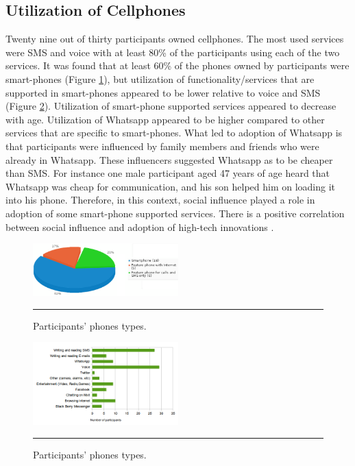 \subsection{Utilization of Cellphones}
Twenty nine out of thirty participants owned cellphones. The most used services were SMS and voice with at least 80\% of the participants using each of the two services. It was found that at least 60\% of the phones owned by participants were smart-phones (Figure \ref{figure:cell_ownership}), but utilization of functionality/services that are supported in smart-phones appeared to be lower relative to voice and SMS (Figure \ref{figure:cell_utilization}). Utilization of smart-phone supported services appeared to decrease with age. Utilization of Whatsapp appeared to be higher compared to other services that are specific to smart-phones. What led to adoption of Whatsapp is that participants were influenced by family members and friends who were already in Whatsapp. These influencers suggested Whatsapp as to be cheaper than SMS. For instance one male participant aged 47 years of age heard that Whatsapp was cheap for communication, and his son helped him on loading it into his phone. Therefore, in this context, social influence played a role in adoption of some smart-phone supported services. There is a positive correlation between social influence and adoption of high-tech innovations \citep{vannoy2010social}.  

\begin{figure}[htbp]
  \centering
    \includegraphics[width=0.5\textwidth]{Figures/cell_ownership.png}
    \rule{35em}{0.5pt}
  \caption{Participants' phones types.}
  \label{figure:cell_ownership}
\end{figure}

\begin{figure}[htbp]
  \centering
    \includegraphics[width=0.5\textwidth]{Figures/cell_utilization.png}
    \rule{35em}{0.5pt}
  \caption{Participants' phones types.}
  \label{figure:cell_utilization}
\end{figure}
